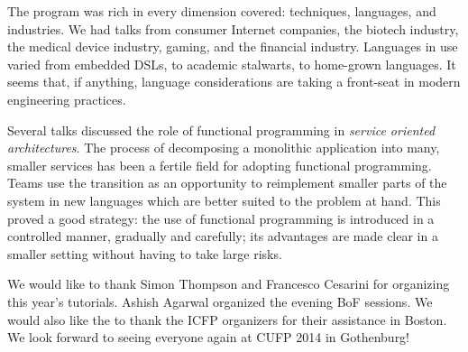 \documentclass{jfp1}
\begin{document}
The program was rich in every dimension covered: techniques,
languages, and industries. We had talks from consumer Internet
companies, the biotech industry, the medical device industry, gaming,
and the financial industry. Languages in use varied from embedded
DSLs, to academic stalwarts, to home-grown languages. It seems that,
if anything, language considerations are taking a front-seat in modern
engineering practices.

Several talks discussed the role of functional programming in
\textit{service oriented architectures}. The process of decomposing a
monolithic application into many, smaller services has been a
fertile field for adopting functional programming. Teams
use the transition as an opportunity to reimplement smaller parts of
the system in new languages which are better suited to the problem at
hand. This proved a good strategy: the use of functional programming
is introduced in a controlled manner, gradually and carefully; its
advantages are made clear in a smaller setting without having to take
large risks.

We would like to thank Simon Thompson and Francesco Cesarini for
organizing this year's tutorials. Ashish Agarwal organized the evening
BoF sessions. We would also like the to thank the ICFP organizers for
their assistance in Boston. We look forward to seeing everyone again
at CUFP 2014 in Gothenburg!


\end{document}
